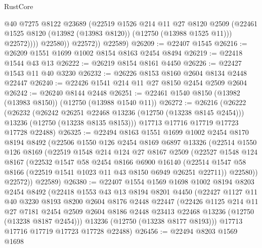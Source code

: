 \begin{lexlean}{RustCore}
\begin{coremodule}
                    @40
                    @7275
                    @8122
                    @23689
                    (@22519
                      @1526
                      @214
                      @11
                      @27
                      @8120
                      @2509
                      (@22461 @1525 @8120 (@13982 (@13983 @8120)) (@12750 (@13988 @1525 @11)))
                      @22572))))
              @22580))
          @22572))
      @22589)
@26209 := @22407 @1545
@26216 := @26209 @1551 @1699 @1002 @8154 @8163 @2454 @8494
@26219 := @22418 @1544 @43 @13
@26222 := @26219 @8154 @8161 @4450
@26226 := @22427 @1543 @11 @40 @3230
@26232 := @26226 @8153 @8160 @2604 @8134 @2448 @22447
@26240 := @22426 @1541 @214 @11 @27 @8150 @2454 @2509 @2604
@26242 := @26240 @8144 @2448
@26251 := @22461 @1540 @8150 (@13982 (@13983 @8150)) (@12750 (@13988 @1540 @11))
@26272 := @26216
    (@26222
      (@26232
        (@26242 @26251 @22468 @13236 (@12750 (@13238 @8145 @2454)))
        @13236
        (@12750 (@13238 @8135 @8153)))
      @17713
      @17716
      @17719
      @17723
      @17728
      @22488)
@26325 := @22494
    @8163
    @1551
    @1699
    @1002
    @2454
    @8170
    @8194
    @8492
    (@22506
      @1550
      @126
      @2454
      @8169
      @6897
      @13326
      (@22514
        @1550
        @126
        @8169
        (@22519
          @1548
          @214
          @124
          @27
          @8167
          @2509
          (@22527
            @1548
            @124
            @8167
            (@22532
              @1547
              @58
              @2454
              @8166
              @6900
              @16140
              (@22514 @1547 @58 @8166 (@22519 @1541 @1023 @11 @43 @8150 @6949 @26251 @22711))
              @22580))
          @22572))
      @22589)
@26380 := @22407
    @1554
    @1569
    @1698
    @1002
    @8194
    @8203
    @2454
    @8492
    (@22418
      @1553
      @43
      @13
      @8194
      @8201
      @4450
      (@22427
        @1127
        @11
        @40
        @3230
        @8193
        @8200
        @2604
        @8176
        @2448
        @22447
        (@22426
          @1125
          @214
          @11
          @27
          @7181
          @2454
          @2509
          @2604
          @8186
          @2448
          @23413
          @22468
          @13236
          (@12750 (@13238 @8187 @2454)))
        @13236
        (@12750 (@13238 @8177 @8193)))
      @17713
      @17716
      @17719
      @17723
      @17728
      @22488)
@26456 := @22494
    @8203
    @1569
    @1698

\end{coremodule}
\end{lexlean}
